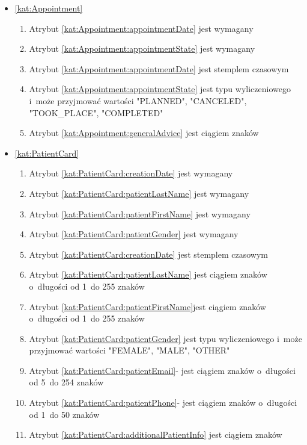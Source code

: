\begin{itemize}[label={\textbf{Ograniczenia dla}}, wide, labelwidth=!, labelindent=0pt]
    \setlength\itemsep{1.75em}
    \item\ref{kat:Appointment}\mynobreakpar
    \begin{enumerate}[label={\textbf{OGR/5/\protect\twodigits{\arabic{enumi}}}}, wide, labelwidth=!, align=left, leftmargin=3cm]
        \item Atrybut \ref{kat:Appointment:appointmentDate} jest wymagany
        \item Atrybut \ref{kat:Appointment:appointmentState} jest wymagany

        \item Atrybut \ref{kat:Appointment:appointmentDate} jest stemplem czasowym
        \item Atrybut \ref{kat:Appointment:appointmentState} jest typu wyliczeniowego i~może przyjmować wartości "PLANNED", "CANCELED", "TOOK\_PLACE", "COMPLETED"
        \item Atrybut \ref{kat:Appointment:generalAdvice} jest ciągiem znaków
    \end{enumerate}

    \item\ref{kat:PatientCard}\mynobreakpar
    \begin{enumerate}[label={\textbf{OGR/5/\protect\twodigits{\arabic{enumi}}}}, wide, labelwidth=!, align=left, leftmargin=3cm, resume]
        \item Atrybut \ref{kat:PatientCard:creationDate} jest wymagany
        \item Atrybut \ref{kat:PatientCard:patientLastName} jest wymagany
        \item Atrybut \ref{kat:PatientCard:patientFirstName} jest wymagany
        \item Atrybut \ref{kat:PatientCard:patientGender} jest wymagany

        \item Atrybut \ref{kat:PatientCard:creationDate} jest stemplem czasowym
        \item Atrybut \ref{kat:PatientCard:patientLastName} jest ciągiem znaków o~długości od 1~do 255 znaków
        \item Atrybut \ref{kat:PatientCard:patientFirstName}jest ciągiem znaków o~długości od 1~do 255 znaków
        \item Atrybut \ref{kat:PatientCard:patientGender} jest typu wyliczeniowego i~może przyjmować wartości "FEMALE", "MALE", "OTHER"
        \item Atrybut \ref{kat:PatientCard:patientEmail}- jest ciągiem znaków o~długości od 5~do 254 znaków
        \item Atrybut \ref{kat:PatientCard:patientPhone}- jest ciągiem znaków o~długości od 1~do 50 znaków
        \item Atrybut \ref{kat:PatientCard:additionalPatientInfo} jest ciągiem znaków
    \end{enumerate}


\end{itemize}

